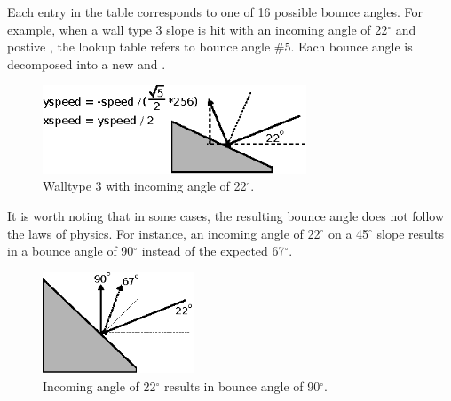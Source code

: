 \documentclass[book.tex]{subfiles}
\begin{document}
\par
Each entry in the table corresponds to one of 16 possible bounce angles. For example, when a wall type 3 slope is hit with an incoming angle of 22$^{\circ}$ and postive , the lookup table refers to bounce angle \#5. Each bounce angle is decomposed into a new  and .\\


\par
\begin{figure}[H]
\centering
\includegraphics[width=0.7\textwidth]{imgs/drawings/bounce_angle.eps}
\caption{Walltype 3 with incoming angle of 22$^{\circ}$.}
\label{fig:bounce_angles}
\end{figure}
\par

\begin{minipage}{\textwidth}
  
\end{minipage}

\bigskip
\par
It is worth noting that in some cases, the resulting bounce angle does not follow the laws of physics. For instance, an incoming angle of 22$^{\circ}$ on a 45$^{\circ}$ slope results in a bounce angle of 90$^{\circ}$ instead of the expected 67$^{\circ}$.\\

\par
\begin{figure}[H]
\centering
\includegraphics[width=0.4\textwidth]{imgs/drawings/bounce_physics.eps}
\caption{Incoming angle of 22$^{\circ}$ results in bounce angle of 90$^{\circ}$.}
\end{figure}
\par
\end{document}
